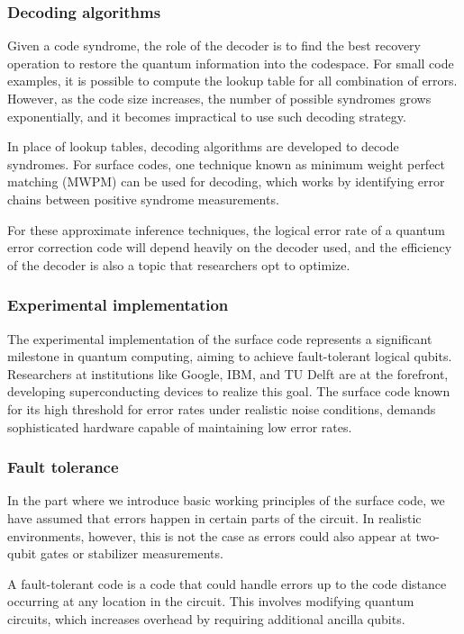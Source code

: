 \subsubsection{Decoding algorithms}
Given a code syndrome, the role of the decoder is to find the best recovery operation to restore the quantum information into the codespace. For small code examples, it is possible to compute the lookup table for all combination of errors. However, as the code size increases, the number of possible syndromes grows exponentially, and it becomes impractical to use such decoding strategy.

In place of lookup tables, decoding algorithms are developed to decode syndromes. For surface codes, one technique known as minimum weight perfect matching (MWPM) can be used for decoding, which works by identifying error chains between positive syndrome measurements.

For these approximate inference techniques, the logical error rate of a quantum error correction code will depend heavily on the decoder used, and the efficiency of the decoder is also a topic that researchers opt to optimize.

\subsubsection{Experimental implementation}
The experimental implementation of the surface code represents a significant milestone in quantum computing, aiming to achieve fault-tolerant logical qubits. Researchers at institutions like Google, IBM, and TU Delft are at the forefront, developing superconducting devices to realize this goal. The surface code known for its high threshold for error rates under realistic noise conditions, demands sophisticated hardware capable of maintaining low error rates.

\subsubsection{Fault tolerance}
In the part where we introduce basic working principles of the surface code, we have assumed that errors happen in certain parts of the circuit. In realistic environments, however, this is not the case as errors could also appear at two-qubit gates or stabilizer measurements.

A fault-tolerant code is a code that could handle errors up to the code distance occurring at any location in the circuit. This involves modifying quantum circuits, which increases overhead by requiring additional ancilla qubits.